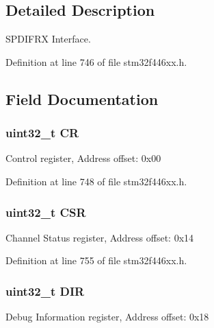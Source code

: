 \subsection{Detailed Description}
S\+P\+D\+I\+F\+RX Interface. 

Definition at line 746 of file stm32f446xx.\+h.



\subsection{Field Documentation}
\subsubsection[{\texorpdfstring{CR}{CR}}]{ uint32\+\_\+t CR}\hypertarget{struct_s_p_d_i_f_r_x___type_def_ab40c89c59391aaa9d9a8ec011dd0907a}{}\label{struct_s_p_d_i_f_r_x___type_def_ab40c89c59391aaa9d9a8ec011dd0907a}
Control register, Address offset\+: 0x00 

Definition at line 748 of file stm32f446xx.\+h.

\subsubsection[{\texorpdfstring{C\+SR}{CSR}}]{ uint32\+\_\+t C\+SR}\hypertarget{struct_s_p_d_i_f_r_x___type_def_a876dd0a8546697065f406b7543e27af2}{}\label{struct_s_p_d_i_f_r_x___type_def_a876dd0a8546697065f406b7543e27af2}
Channel Status register, Address offset\+: 0x14 

Definition at line 755 of file stm32f446xx.\+h.

\subsubsection[{\texorpdfstring{D\+IR}{DIR}}]{ uint32\+\_\+t D\+IR}\hypertarget{struct_s_p_d_i_f_r_x___type_def_a7bad11e3dbbfcc3c1317dc68669d3f51}{}\label{struct_s_p_d_i_f_r_x___type_def_a7bad11e3dbbfcc3c1317dc68669d3f51}
Debug Information register, Address offset\+: 0x18 

